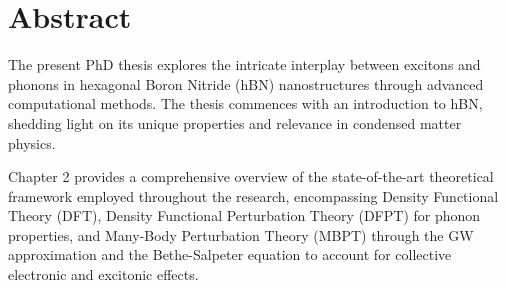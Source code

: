 \chapter*{Abstract}

The present PhD thesis explores the intricate interplay between excitons and phonons in hexagonal Boron Nitride (hBN) nanostructures through advanced computational methods. The thesis commences with an introduction to hBN, shedding light on its unique properties and relevance in condensed matter physics. 

Chapter 2 provides a comprehensive overview of the state-of-the-art theoretical framework employed throughout the research, encompassing Density Functional Theory (DFT), Density Functional Perturbation Theory (DFPT) for phonon properties, and Many-Body Perturbation Theory (MBPT) through the GW approximation and the Bethe-Salpeter equation to account for collective electronic and excitonic effects.

